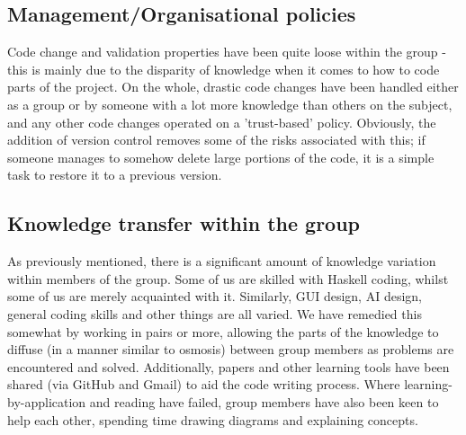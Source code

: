 \documentclass[11pt]{article}
\begin{document}
\subsection{Management/Organisational policies}
Code change and validation properties have been quite loose within the group - 
this is mainly due to the disparity of knowledge when it comes to how to code 
parts of the project. On the whole, drastic code changes have been handled 
either as a group or by someone with a lot more knowledge than others on the 
subject, and any other code changes operated on a 'trust-based' policy. 
Obviously, the addition of version control removes some of the risks associated
with this; if someone manages to somehow delete large portions of the code, it
is a simple task to restore it to a previous version.

\subsection{Knowledge transfer within the group}
As previously mentioned, there is a significant amount of knowledge variation
within members of the group. Some of us are skilled with Haskell coding, whilst
some of us are merely acquainted with it. Similarly, GUI design, AI design,
general coding skills and other things are all varied. We have remedied this 
somewhat by working in pairs or more, allowing the parts of the knowledge to 
diffuse (in a manner similar to osmosis) between group members as problems are
encountered and solved. Additionally, papers and other learning tools have been
shared (via GitHub and Gmail) to aid the code writing process. Where 
learning-by-application and reading have failed, group members have also been
keen to help each other, spending time drawing diagrams and explaining concepts.
\end{document}
